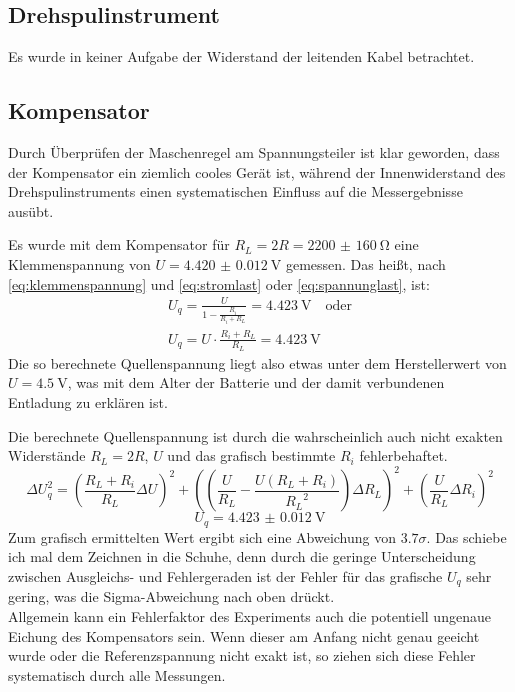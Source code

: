 \subsection{Drehspulinstrument}
Es wurde in keiner Aufgabe der Widerstand der leitenden Kabel betrachtet. 

\subsection{Kompensator}
Durch Überprüfen der Maschenregel am Spannungsteiler ist klar geworden, dass der Kompensator ein ziemlich cooles Gerät ist, während der Innenwiderstand des Drehspulinstruments einen systematischen Einfluss auf die Messergebnisse ausübt.

Es wurde mit dem Kompensator für \(R_L=2R=\qty{2200(160)}{\ohm}\) eine Klemmenspannung von \(U=\qty{4.420(12)}{\volt}\) gemessen. Das heißt, nach \cref{eq:klemmenspannung} und \cref{eq:stromlast} oder \cref{eq:spannunglast}, ist:
\begin{gather}
    U_q=\frac{U}{1-\frac{R_i}{R_i+R_L}}=\qty{4.423}{\volt}\quad\text{oder}\\
    U_q=U\cdot \frac{R_i+R_L}{R_L}=\qty{4.423}{\volt}
\end{gather}
Die so berechnete Quellenspannung liegt also etwas unter dem Herstellerwert von \(U=\qty{4.5}{\volt}\), was mit dem Alter der Batterie und der damit verbundenen Entladung zu erklären ist.

Die berechnete Quellenspannung ist durch die wahrscheinlich auch nicht exakten Widerstände \(R_L=2R\), \(U\) und das grafisch bestimmte \(R_i\) fehlerbehaftet.
\begin{equation}
\Delta U_q^2=\left(\frac{R_L+R_i}{R_L} \Delta U\right)^2+\left(\left(\frac{U}{R_L}-\frac{U \left(R_L+R_i\right)}{{R_L}^2}\right) \Delta R_L\right)^2+\left(\frac{U}{R_L} \Delta R_i\right)^2
\end{equation}
\[U_q=\qty{4.423(12)}{\volt}\]
Zum grafisch ermittelten Wert ergibt sich eine Abweichung von \(3.7\sigma\). Das schiebe ich mal dem Zeichnen in die Schuhe, denn durch die geringe Unterscheidung zwischen Ausgleichs- und Fehlergeraden ist der Fehler für das grafische \(U_q\) sehr gering, was die Sigma-Abweichung nach oben drückt. \\
Allgemein kann ein Fehlerfaktor des Experiments auch die potentiell ungenaue Eichung des Kompensators sein. Wenn dieser am Anfang nicht genau geeicht wurde oder die Referenzspannung nicht exakt ist, so ziehen sich diese Fehler systematisch durch alle Messungen. 

